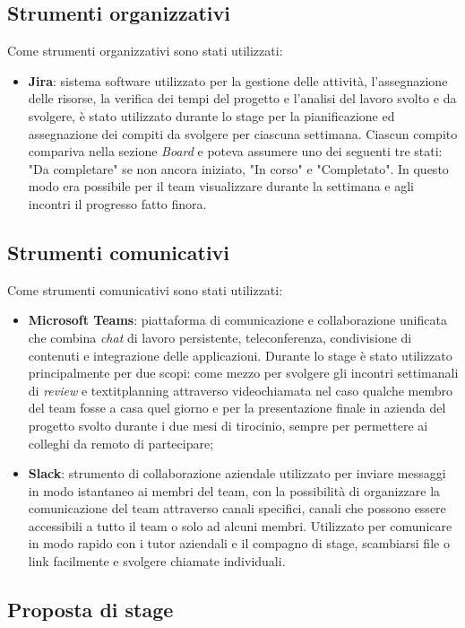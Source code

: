 \subsection{Strumenti organizzativi}
Come strumenti organizzativi sono stati utilizzati:
\begin{itemize}
    \item \textbf{Jira}: sistema software utilizzato per la gestione delle attività, l'assegnazione delle risorse, la verifica dei tempi del progetto e l'analisi del lavoro svolto e da svolgere, è stato utilizzato durante lo stage per la pianificazione ed assegnazione dei compiti da svolgere per ciascuna settimana. Ciascun compito compariva nella sezione \textit{Board} e poteva assumere uno dei seguenti tre stati: "Da completare" se non ancora iniziato, "In corso" e "Completato". In questo modo era possibile per il team visualizzare durante la settimana e agli incontri il progresso fatto finora.
\end{itemize}


\subsection{Strumenti comunicativi}
Come strumenti comunicativi sono stati utilizzati:
\begin{itemize}
    \item \textbf{Microsoft Teams}: piattaforma di comunicazione e collaborazione unificata che combina \textit{chat} di lavoro persistente, teleconferenza, condivisione di contenuti e integrazione delle applicazioni. Durante lo stage è stato utilizzato principalmente per due scopi: come mezzo per svolgere gli incontri settimanali di \textit{review} e textit{planning} attraverso videochiamata nel caso qualche membro del team fosse a casa quel giorno e per la presentazione finale in azienda del progetto svolto durante i due mesi di tirocinio, sempre per permettere ai colleghi da remoto di partecipare;
    \item \textbf{Slack}: strumento di collaborazione aziendale utilizzato per inviare messaggi in modo istantaneo ai membri del team, con la possibilità di organizzare la comunicazione del team attraverso canali specifici, canali che possono essere accessibili a tutto il team o solo ad alcuni membri. Utilizzato per comunicare in modo rapido con i tutor aziendali e il compagno di stage, scambiarsi file o link facilmente e svolgere chiamate individuali. 
\end{itemize}

\subsection{Proposta di stage}

